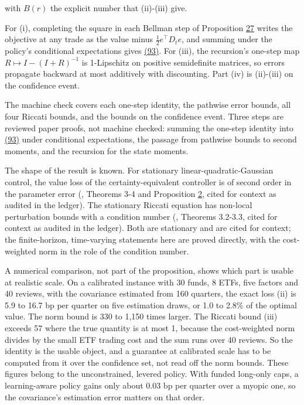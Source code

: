 \documentclass[11pt]{article}
\begin{document}
with \(B(r)\) the explicit number that (ii)-(iii) give.

For (i), completing the square in each Bellman step of Proposition \hyperref[res:Proposition-27]{27}
writes the objective at any trade as the value minus
\(\frac12e^\top D_te\), and summing under the policy's conditional
expectations gives \hyperref[eq:93]{(93)}. For (iii), the recursion's one-step map
\(R\mapsto I-(I+R)^{-1}\) is 1-Lipschitz on positive semidefinite
matrices, so errors propagate backward at most additively with
discounting. Part (iv) is (ii)-(iii) on the confidence event.

The machine check covers each one-step identity, the pathwise error
bounds, all four Riccati bounds, and the bounds on the confidence
event. Three steps are reviewed paper proofs, not machine checked:
summing the one-step identity into \hyperref[eq:93]{(93)} under conditional
expectations, the passage from pathwise bounds to second moments, and
the recursion for the state moments.

The shape of the result is known. For stationary
linear-quadratic-Gaussian control, the value loss of the
certainty-equivalent controller is of second order in the parameter
error (\cite{mania2019certainty}, Theorems 3-4 and Proposition \hyperref[res:Proposition-2]{2}, cited for
context as audited in the ledger). The stationary Riccati equation has non-local perturbation
bounds with a condition number (\cite{konstantinov1993perturbation},
Theorems 3.2-3.3, cited for context as audited in the ledger). Both are stationary and are cited
for context; the finite-horizon, time-varying statements here are
proved directly, with the cost-weighted norm in the role of the
condition number.

A numerical comparison, not part of the proposition, shows which
part is usable at realistic scale. On a calibrated instance with 30
funds, 8 ETFs, five factors and 40 reviews, with the covariance
estimated from 160 quarters, the exact loss (ii) is 5.9 to 16.7 bp
per quarter on five estimation draws, or 1.0 to 2.8\% of the optimal
value. The norm bound is 330 to 1,150 times larger. The Riccati bound
(iii) exceeds 57 where the true quantity is at most 1, because the
cost-weighted norm divides by the small ETF trading cost and the sum
runs over 40 reviews. So the identity is the usable object, and a
guarantee at calibrated scale has to be computed from it over the
confidence set, not read off the norm bounds. These figures belong to
the unconstrained, levered policy. With funded long-only caps, a
learning-aware policy gains only about 0.03 bp per quarter over a
myopic one, so the covariance's estimation error matters on that
order.
\end{document}
